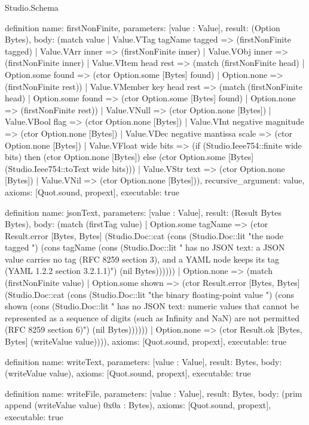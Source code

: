 \begin{lexlean}{Studio.Schema}
\begin{semanticmodule}
definition{
  name: firstNonFinite,
  parameters: [value : Value],
  result: (Option Bytes),
  body: (match value
    | Value.VTag tagName tagged => (firstNonFinite tagged)
    | Value.VArr inner => (firstNonFinite inner)
    | Value.VObj inner => (firstNonFinite inner)
    | Value.VItem head rest => (match (firstNonFinite head)
      | Option.some found => (ctor Option.some [Bytes] found)
      | Option.none => (firstNonFinite rest))
    | Value.VMember key head rest => (match (firstNonFinite head)
      | Option.some found => (ctor Option.some [Bytes] found)
      | Option.none => (firstNonFinite rest))
    | Value.VNull => (ctor Option.none [Bytes])
    | Value.VBool flag => (ctor Option.none [Bytes])
    | Value.VInt negative magnitude => (ctor Option.none [Bytes])
    | Value.VDec negative mantissa scale => (ctor Option.none [Bytes])
    | Value.VFloat wide bits => (if (Studio.Ieee754::finite wide bits) then (ctor Option.none [Bytes]) else (ctor Option.some [Bytes] (Studio.Ieee754::toText wide bits)))
    | Value.VStr text => (ctor Option.none [Bytes])
    | Value.VNil => (ctor Option.none [Bytes])),
  recursive_argument: value,
  axioms: [Quot.sound, propext],
  executable: true
}

definition{
  name: jsonText,
  parameters: [value : Value],
  result: (Result Bytes Bytes),
  body: (match (firstTag value)
    | Option.some tagName => (ctor Result.error [Bytes, Bytes] (Studio.Doc::cat (cons (Studio.Doc::lit "the node tagged ") (cons tagName (cons (Studio.Doc::lit " has no JSON text: a JSON value carries no tag (RFC 8259 section 3), and a YAML node keeps its tag (YAML 1.2.2 section 3.2.1.1)") (nil Bytes))))))
    | Option.none => (match (firstNonFinite value)
      | Option.some shown => (ctor Result.error [Bytes, Bytes] (Studio.Doc::cat (cons (Studio.Doc::lit "the binary floating-point value ") (cons shown (cons (Studio.Doc::lit " has no JSON text: numeric values that cannot be represented as a sequence of digits (such as Infinity and NaN) are not permitted (RFC 8259 section 6)") (nil Bytes))))))
      | Option.none => (ctor Result.ok [Bytes, Bytes] (writeValue value)))),
  axioms: [Quot.sound, propext],
  executable: true
}

definition{
  name: writeText,
  parameters: [value : Value],
  result: Bytes,
  body: (writeValue value),
  axioms: [Quot.sound, propext],
  executable: true
}

definition{
  name: writeFile,
  parameters: [value : Value],
  result: Bytes,
  body: (prim append (writeValue value) 0x0a : Bytes),
  axioms: [Quot.sound, propext],
  executable: true
}


\end{semanticmodule}
\end{lexlean}
